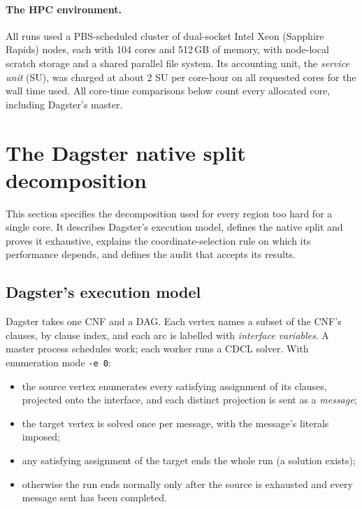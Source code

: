 \documentclass[11pt,a4paper,oneside]{report}
\theoremstyle{definition}
\newcommand{\code}[1]{\texttt{#1}}
\begin{document}
\paragraph{The HPC environment.} All runs used a PBS-scheduled cluster of dual-socket Intel Xeon
(Sapphire Rapids) nodes, each with 104 cores and 512\,GB of memory, with node-local scratch
storage and a shared parallel file system. Its accounting unit, the \emph{service unit} (SU), was
charged at about 2 SU per core-hour on all requested cores for the wall time used. All core-time
comparisons below count every allocated core, including Dagster's master.

\section{The Dagster native split decomposition}\label{p8-sec:decomp}
This section specifies the decomposition used for every region too hard for a single core. It describes Dagster's execution model, defines the native split and proves it exhaustive, explains the coordinate-selection rule on which its performance depends, and defines the audit that accepts its results.


\subsection{Dagster's execution model}

Dagster takes one CNF and a DAG. Each vertex names a subset of the CNF's clauses, by clause
index, and each arc is labelled with \emph{interface variables}. A master process schedules
work; each worker runs a CDCL solver. With enumeration mode \code{-e 0}:
\begin{itemize}
\item the source vertex enumerates every satisfying assignment of its clauses, projected onto
the interface, and each distinct projection is sent as a \emph{message};
\item the target vertex is solved once per message, with the message's literals imposed;
\item any satisfying assignment of the target ends the whole run (a solution exists);
\item otherwise the run ends normally only after the source is exhausted and every message
sent has been completed.
\end{itemize}
\end{document}
